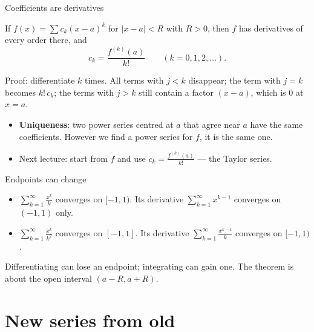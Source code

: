 \documentclass{wosm-slides}
\begin{document}
\begin{frame}{Coefficients are derivatives}
  \begin{corollary}
    If $f(x) = \sum c_k (x - a)^k$ for $|x - a| < R$ with $R > 0$, then $f$ has derivatives of
    every order there, and
    \[ c_k = \frac{f^{(k)}(a)}{k!} \qquad (k = 0, 1, 2, \dots) . \]
  \end{corollary}
  \pause
  {\small Proof: differentiate $k$ times. All terms with $j < k$ disappear; the term with $j = k$
  becomes $k!\, c_k$; the terms with $j > k$ still contain a factor $(x - a)$, which is $0$ at
  $x = a$.\par}
  \pause
  \begin{itemize}
    \item \textbf{Uniqueness}: two power series centred at $a$ that agree near $a$ have the same
      coefficients. However we find a power series for $f$, it is the same one.
    \item Next lecture: start from $f$ and use $c_k = \frac{f^{(k)}(a)}{k!}$ --- the Taylor series.
  \end{itemize}
\end{frame}

\begin{frame}{Endpoints can change}
  \begin{example}
    \begin{itemize}
      \item $\sum_{k=1}^\infty \frac{x^k}{k}$ converges on $[-1, 1)$. Its derivative
        $\sum_{k=1}^\infty x^{k-1}$ converges on $(-1, 1)$ only.
      \item $\sum_{k=1}^\infty \frac{x^k}{k^2}$ converges on $[-1, 1]$. Its derivative
        $\sum_{k=1}^\infty \frac{x^{k-1}}{k}$ converges on $[-1, 1)$.
    \end{itemize}
  \end{example}
  Differentiating can lose an endpoint; integrating can gain one.
  The theorem is about the open interval $(a - R, a + R)$.
\end{frame}

\section{New series from old}
\end{document}
